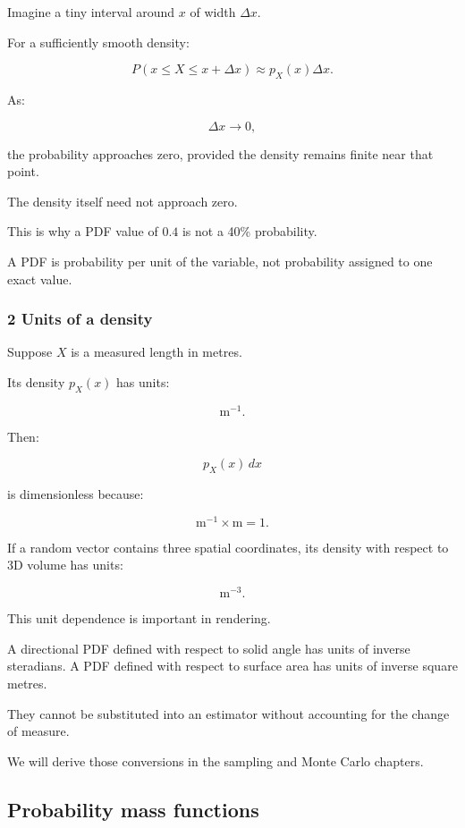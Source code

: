 \hypertarget{02-foundations-ii-ch023-why-individual-exact-values-have-zero-probability}{}

Imagine a tiny interval around \(x\) of width \(\Delta x\).

For a sufficiently smooth density:

\[
 P(x\le X\le x+\Delta x) \approx p_X(x)\Delta x.
\]

As:

\[
 \Delta x\to0,
\]

the probability approaches zero, provided the density remains finite near that point.

The density itself need not approach zero.

This is why a PDF value of \(0.4\) is not a 40\% probability.

A PDF is probability per unit of the variable, not probability assigned to one exact value.

\subsubsection{2 Units of a density}\label{02-foundations-ii-ch023-units-of-a-density}

\hypertarget{02-foundations-ii-ch023-units-of-a-density}{}

Suppose \(X\) is a measured length in metres.

Its density \(p_X(x)\) has units:

\[
 \mathrm m^{-1}.
\]

Then:

\[
 p_X(x)\,dx
\]

is dimensionless because:

\[
 \mathrm m^{-1}\times\mathrm m=1.
\]

If a random vector contains three spatial coordinates, its density with respect to 3D volume has units:

\[
 \mathrm m^{-3}.
\]

This unit dependence is important in rendering.

A directional PDF defined with respect to solid angle has units of inverse steradians. A PDF defined with respect to surface area has units of inverse square metres.

They cannot be substituted into an estimator without accounting for the change of measure.

We will derive those conversions in the sampling and Monte Carlo chapters.

\subsection{Probability mass functions}\label{02-foundations-ii-ch023-probability-mass-functions}

